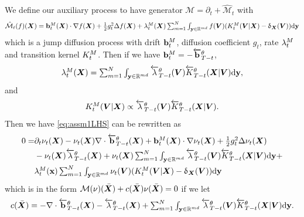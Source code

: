 We define our auxiliary process to have generator $\mathcal{M} = \partial_t + \hat{\mathcal{M}}_t$ with
\begin{equation}
  \textstyle 
    \hat{\mathcal{M}}_t(f)({\bm{X}}) = \mathbf{b}^M_t ({\bm{X}}) \cdot \nabla f({\bm{X}}) + \frac{1}{2} g_{t}^2 \Delta f ({\bm{X}}) + \lambda^M_t({\bm{X}}) \sum_{m=1}^N \int_{\mathbf{y} \in \mathbb{R}^{md}} f({\bm{V}}) ( K^{M}_t({\bm{V}} | {\bm{X}}) - \updelta_{{\bm{X}}}({\bm{V}}) ) \mathrm{d} \mathbf{y}
\end{equation}
which is a jump diffusion process with drift $\mathbf{b}^M_t$, diffusion coefficient $g_{t}$, rate $\lambda^M_t$ and transition kernel $K^{M}_t$. Then if we have $\mathbf{b}^M_t = - \overleftarrow{\mathbf{b}}_{T-t}^\theta$,
\begin{equation}
  \label{eq:def_mrate}
  \textstyle 
    \lambda^M_t({\bm{X}}) = \sum_{m=1}^N \int_{\mathbf{y} \in \mathbb{R}^{md}} \overleftarrow{\lambda}_{T-t}^\theta({\bm{V}}) \overleftarrow{K}_{T-t}^\theta({\bm{X}} | {\bm{V}}) \mathrm{d} \mathbf{y} , 
\end{equation}
and
\begin{equation}
  \label{eq:def_mtkt}
  \textstyle 
    K^{M}_t ({\bm{V}} | {\bm{X}}) \propto \overleftarrow{\lambda}_{T-t}^\theta({\bm{V}}) \overleftarrow{K}_{T-t}^\theta({\bm{X}} | {\bm{V}}) . 
\end{equation}
Then we have \eqref{eq:assm1LHS} can be rewritten as 
\begin{align}
    0 = &\textstyle \partial_t \nu_t({\bm{X}}) - \nu_t({\bm{X}}) \nabla \cdot \overleftarrow{\mathbf{b}}_{T-t}^\theta({\bm{X}}) + \mathbf{b}^M_t({\bm{X}}) \cdot \nabla \nu_t({\bm{X}}) + \frac{1}{2} g_{t}^2 \Delta \nu_t({\bm{X}})\\
    &\textstyle - \nu_t({\bm{X}}) \overleftarrow{\lambda}_{T-t}^\theta({\bm{X}}) + \nu_t({\bm{X}}) \sum_{m=1}^N \int_{\mathbf{y} \in \mathbb{R}^{md}} \overleftarrow{\lambda}_{T-t}^\theta({\bm{V}}) \overleftarrow{K}_{T-t}^\theta({\bm{X}} | {\bm{V}}) \mathrm{d} \mathbf{y} + \\
    &\textstyle  \lambda^M_t({\mathbf{x}}) \sum_{m=1}^N \int_{\mathbf{y} \in \mathbb{R}^{md}} \nu_t({\bm{V}}) ( K^{M}_t({\bm{V}} | {\bm{X}}) - \updelta_{{\bm{X}}}({\bm{V}}) )\mathrm{d} \mathbf{y}
\end{align}
which is in the form $\mathcal{M}(\nu)(\bar{{\bm{X}}}) + c(\bar{{\bm{X}}}) \nu(\bar{{\bm{X}}}) = 0$ if we let
\begin{equation}
  \textstyle 
    c(\bar{{\bm{X}}}) = -\nabla \cdot \overleftarrow{\mathbf{b}}_{T-t}^\theta({\bm{X}}) - \overleftarrow{\lambda}_{T-t}^\theta({\bm{X}}) + \sum_{m=1}^N \int_{\mathbf{y} \in \mathbb{R}^{md}} \overleftarrow{\lambda}_{T-t}^\theta({\bm{V}}) \overleftarrow{K}_{T-t}^\theta({\bm{X}} | {\bm{V}}) \mathrm{d} \mathbf{y} . 
\end{equation}

